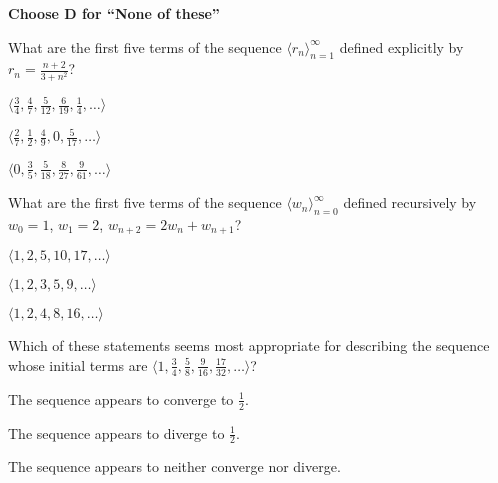 \documentclass[12pt]{exam}
\newcommand{\<}{\langle}
\renewcommand{\>}{\rangle}
\begin{document}
\begin{center}
\end{center}
\vspace{0.1in}

\vspace{12pt}

\textbf{Choose D for ``None of these''}

\begin{questions}\setcounter{question}{25}

\question
What are the first five terms of the sequence \(\<r_n\>_{n=1}^\infty\)
defined explicitly by \(r_n=\frac{n+2}{3+n^2}\)?
\begin{choices}
\item
  \(\<\frac{3}{4},\frac{4}{7},\frac{5}{12},\frac{6}{19},\frac{1}{4},\dots\>\)
\item
  \(\<\frac{2}{7},\frac{1}{2},\frac{4}{9},0,\frac{5}{17},\dots\>\)
\item
  \(\<0,\frac{3}{5},\frac{5}{18},\frac{8}{27},\frac{9}{61},\dots\>\)
\end{choices}

\question
What are the first five terms of the sequence \(\<w_n\>_{n=0}^\infty\)
defined recursively by \(w_0=1\), \(w_1=2\), \(w_{n+2}=2w_n+w_{n+1}\)?
\begin{choices}
\item
  \(\<1,2,5,10,17,\dots\>\)
\item
  \(\<1,2,3,5,9,\dots\>\)
\item
  \(\<1,2,4,8,16,\dots\>\)
\end{choices}

\question
Which of these statements seems most appropriate for describing the
sequence whose initial terms are
\(\<1,\frac{3}{4},\frac{5}{8},\frac{9}{16},\frac{17}{32},\dots\>\)?
\begin{choices}
\item The sequence appears to converge to \(\frac{1}{2}\).
\item The sequence appears to diverge to \(\frac{1}{2}\).
\item The sequence appears to neither converge nor diverge.
\end{choices}





\end{questions}
\end{document}

